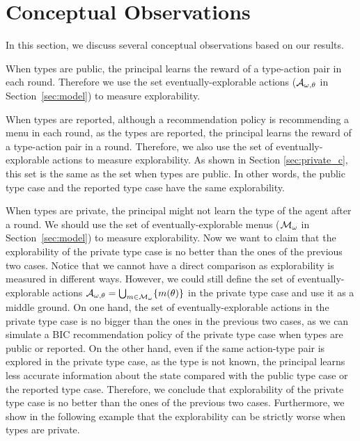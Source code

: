 
\section{Conceptual Observations}
In this section, we discuss several conceptual observations based on our results.

When types are public, the principal learns the reward of a type-action pair in each round. Therefore we use the set eventually-explorable actions ($\mathcal{A}_{\omega,\theta}$ in Section~\ref{sec:model}) to measure explorability.

When types are reported, although a recommendation policy is recommending a menu in each round, as the types are reported, the principal learns the reward of a type-action pair in a round. Therefore, we also use the set of eventually-explorable actions to measure explorability. As shown in Section \ref{sec:private_c}, this set is the same as the set when types are public. In other words, the public type case and the reported type case have the same explorability.

When types are private, the principal might not learn the type of the agent after a round. We should use the set of eventually-explorable menus ($\mathcal{M}_{\omega}$ in Section~\ref{sec:model}) to measure explorability. Now we want to claim that the explorability of the private type case is no better than the ones of the previous two cases. Notice that we cannot have a direct comparison as explorability is measured in different ways. However, we could still define the set of eventually-explorable actions $\mathcal{A}_{\omega,\theta} = \bigcup_{m\in \mathcal{M}_{\omega}} \{ m(\theta)\}$ in the private type case and use it as a middle ground. On one hand, the set of eventually-explorable actions in the private type case is no bigger than the ones in the previous two cases, as we can simulate a BIC recommendation policy of the private type case when types are public or reported. On the other hand, even if the same action-type pair is explored in the private type case, as the type is not known, the principal learns less accurate information about the state compared with the public type case or the reported type case. Therefore, we conclude that explorability of the private type case is no better than the ones of the previous two cases.  Furthermore, we show in the following example that the explorability can be strictly worse when types are private.

